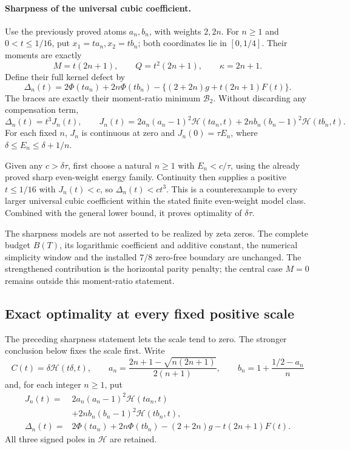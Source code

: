 \paragraph{Sharpness of the universal cubic coefficient.}
Use the previously proved atoms \(a_n,b_n\), with weights \(2,2n\).
For \(n\ge1\) and \(0<t\le1/16\), put \(x_1=ta_n,x_2=tb_n\);
both coordinates lie in \([0,1/4]\).  Their moments are exactly
\[
 M=t(2n+1),\qquad Q=t^2(2n+1),\qquad \kappa=2n+1.
\]
Define their full kernel defect by
\[
 \Delta_n(t)=2\Phi(ta_n)+2n\Phi(tb_n)
   -\{(2+2n)g+t(2n+1)F(t)\}.
\]
The braces are exactly their moment-ratio minimum \(\mathcal B_2\).
Without discarding any compensation term,
\[
 \Delta_n(t)=t^3J_n(t),\qquad
 J_n(t)=2a_n(a_n-1)^2\mathcal H(ta_n,t)
       +2nb_n(b_n-1)^2\mathcal H(tb_n,t).
\]
For each fixed \(n\), \(J_n\) is continuous at zero and
\(J_n(0)=\tau E_n\), where \(\delta\le E_n\le\delta+1/n\).

Given any \(c>\delta\tau\), first choose a natural \(n\ge1\) with
\(E_n<c/\tau\), using the already proved sharp even-weight energy
family.  Continuity then supplies a positive \(t\le1/16\) with
\(J_n(t)<c\), so \(\Delta_n(t)<ct^3\).
This is a counterexample to every larger universal cubic coefficient
within the stated finite even-weight model class.  Combined with the
general lower bound, it proves optimality of \(\delta\tau\).

The sharpness models are not asserted to be realized by zeta zeros.
The complete budget \(B(T)\), its logarithmic coefficient and additive
constant, the numerical simplicity window and the installed \(7/8\)
zero-free boundary are unchanged.  The strengthened contribution is the
horizontal parity penalty; the central case \(M=0\) remains outside
this moment-ratio statement.

\subsection{Exact optimality at every fixed positive scale}
\label{sec:fixed-scale-kernel-optimality}

The preceding sharpness statement lets the scale tend to zero.  The
stronger conclusion below fixes the scale first.  Write
\[
 C(t)=\delta\mathcal H(t\delta,t),\qquad
 a_n=\frac{2n+1-\sqrt{n(2n+1)}}{2(n+1)},\qquad
 b_n=1+\frac{1/2-a_n}{n}
\]
and, for each integer \(n\ge1\), put
\[
 \begin{split}
 J_n(t)={}&2a_n(a_n-1)^2\mathcal H(ta_n,t)\\
 &+2n b_n(b_n-1)^2\mathcal H(tb_n,t),\\
 \Delta_n(t)={}&2\Phi(ta_n)+2n\Phi(tb_n)
 -(2+2n)g-t(2n+1)F(t).
 \end{split}
\]
All three signed poles in \(\mathcal H\) are retained.

